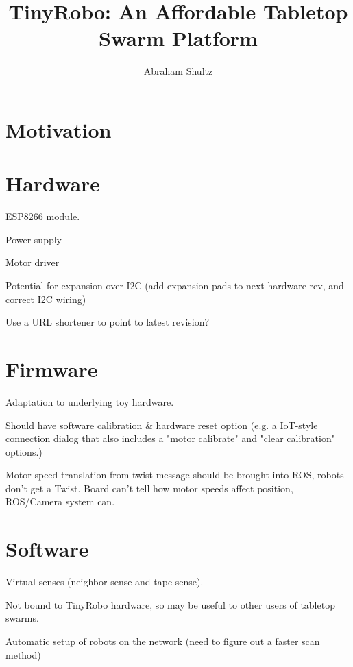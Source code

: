 \documentclass[]{article}
\title{TinyRobo: An Affordable Tabletop Swarm Platform}
\author{Abraham Shultz}
\begin{document}
\maketitle

\begin{abstract}

\end{abstract}

\section{Motivation}

\section{Hardware}

ESP8266 module. 

Power supply

Motor driver

Potential for expansion over I2C (add expansion pads to next hardware rev, and correct I2C wiring)

Use a URL shortener to point to latest revision?

\section {Firmware}

Adaptation to underlying toy hardware. 

Should have software calibration \& hardware reset option (e.g. a IoT-style connection dialog that also includes a "motor calibrate" and "clear calibration" options.)

Motor speed translation from twist message should be brought into ROS, robots don't get a Twist. Board can't tell how motor speeds affect position, ROS/Camera system can.

\section{Software}

Virtual senses (neighbor sense and tape sense).

Not bound to TinyRobo hardware, so may be useful to other users of tabletop swarms. 

Automatic setup of robots on the network (need to figure out a faster scan method)
\end{document}
